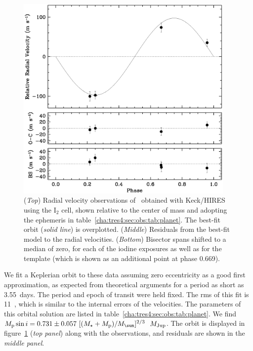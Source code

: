 \begin{figure}
\includegraphics[width=0.95\textwidth]{A_TrES4_f2}
\caption[Keck/HIRES radial velocity observations of \tresFour]{({\em Top}) Radial velocity observations of \tresFour\ obtained with
Keck/HIRES using the I$_2$ cell, shown relative to the center of mass and
adopting the ephemeris in table~\ref{cha:tres4:sec:obs:tab:planet}. The best-fit orbit
({\em solid line}) is overplotted. ({\em Middle}) Residuals from the best-fit
model to the radial velocities. ({\em Bottom}) Bisector spans shifted to a
median of zero, for each of the iodine exposures as well as for the template
(which is shown as an additional point at phase 0.669). \label{cha:tres4:sec:obs:fig:rv}}
\end{figure}

We fit a Keplerian orbit to these data assuming zero eccentricity as a good
first approximation, as expected from theoretical arguments for a period as
short as 3.55~days. The period and epoch of transit were held fixed. The rms of
this fit is 11~\ms, which is similar to the internal errors of the velocities.
The parameters of this orbital solution are listed in table~\ref{cha:tres4:sec:obs:tab:planet}. We
find \mbox{$M_{\rm p} \sin i = 0.731 \pm 0.057~[(M_{\star} + M_{\rm p})/M_{\sun}]^{2/3}$~$M_{\rm Jup}$}.
The orbit is displayed in figure~\ref{cha:tres4:sec:obs:fig:rv} ({\it top panel}) along with the
observations, and residuals are shown in the {\it middle panel}.

